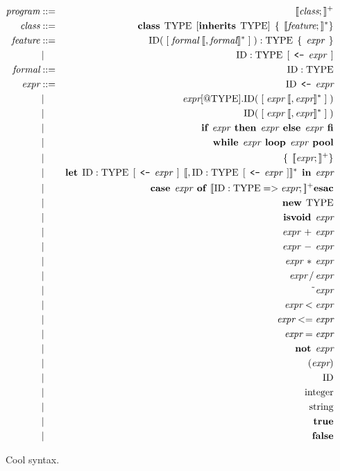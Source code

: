\documentclass[11pt]{article}
\newcommand{\lbk}{\lbrack\!\lbrack}
\newcommand{\rbk}{\rbrack\!\rbrack}
\newcommand {\m}{\mbox}
\newcommand{\grammar}{::=}
\newcommand{\gor}{\,|\,}
\newcommand{\kw}[1]{\m{\bf #1}}
\newcommand{\nt}[1]{\m{\it #1}}
\newcommand{\tm}[1]{\m{#1}}
\newcommand{\s}{\;\,}
\newcommand{\assgn}{\s\m{\tt <-}\s}
\begin{document}
\begin{figure}
\begin{eqnarray*}
\nt{program} & \grammar & \lbk\nt{class};\rbk^{+} \\
\nt{class} & \grammar & \kw{class} \s \tm{TYPE} \s [ \kw{inherits} \s \tm{TYPE} ] \s \{ \s \lbk\nt{feature};\rbk^{\ast} \} \\
\nt{feature} & \grammar & \tm{ID}( \;[ \;\nt{formal}\; \lbk, \nt{formal}\rbk^{\ast}\; ]\; ) : \tm{TYPE} \s \{
   \s \nt{expr} \s \} \\
& \gor & \tm{ID} : \tm{TYPE} \s [ \assgn \nt{expr} \s ] \\
\nt{formal} & \grammar & \tm{ID} : \tm{TYPE} \\
\nt{expr} & \grammar & \tm{ID} \assgn \nt{expr} \\
 & \gor & \nt{expr}[@\tm{TYPE}].\tm{ID}(\;[\;\nt{expr}\;\lbk, \nt{expr}\rbk^{\ast}\;]\;) \\
 & \gor & \tm{ID}(\;[\;\nt{expr}\;\lbk,\nt{expr}\rbk^{\ast}\;]\;) \\
& \gor & \kw{if} \s \nt{expr} \s \kw{then} \s \nt{expr} \s \kw{else} \s \nt{expr} \s \kw{fi}  \\
& \gor & \kw{while} \s \nt{expr} \s \kw{loop} \s \nt{expr} \s \kw{pool} \\
& \gor & \{ \s \lbk\nt{expr};\rbk^+ \} \\
& \gor & \kw{let} \s
         \tm{ID} : \tm{TYPE} \s [ \assgn \nt{expr} \s ] \s
         \lbk, \tm{ID} : \tm{TYPE} \s [ \assgn \nt{expr} \s ]\rbk^* \s
         \kw{in} \s \nt{expr}  \\
& \gor & \kw{case} \s \nt{expr} \s \kw{of} \s
		\lbk \tm{ID} : \tm{TYPE} => \nt{expr}; \rbk^+
	 \kw{esac} \\
& \gor & \kw{new} \s \tm{TYPE} \\
& \gor & \kw{isvoid} \s \nt{expr} \\
& \gor & \nt{expr} \,+\, \nt{expr} \\
& \gor & \nt{expr} \,-\, \nt{expr} \\
& \gor & \nt{expr} \,\ast\, \nt{expr} \\
& \gor & \nt{expr} \,/\, \nt{expr} \\
& \gor & \m{\~{ }}\nt{expr} \\
& \gor & \nt{expr} < \nt{expr} \\
& \gor & \nt{expr} <= \nt{expr} \\
& \gor & \nt{expr} = \nt{expr} \\
& \gor & \kw{not} \s \nt{expr} \\
& \gor & (\nt{expr}) \\
& \gor & \tm{ID} \\
& \gor & \m{integer} \\
& \gor & \m{string} \\
& \gor & \kw{true} \\
& \gor & \kw{false}
\end{eqnarray*}
\caption{Cool syntax.}
\label{fig1}
\end{figure}
\end{document}
